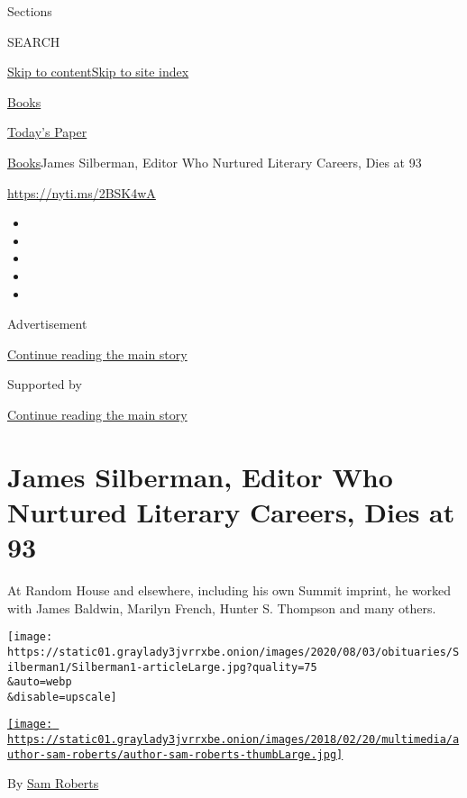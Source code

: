 Sections

SEARCH

\protect\hyperlink{site-content}{Skip to
content}\protect\hyperlink{site-index}{Skip to site index}

\href{https://www.nytimes3xbfgragh.onion/section/books}{Books}

\href{https://myaccount.nytimes3xbfgragh.onion/auth/login?response_type=cookie\&client_id=vi}{}

\href{https://www.nytimes3xbfgragh.onion/section/todayspaper}{Today's
Paper}

\href{/section/books}{Books}\textbar{}James Silberman, Editor Who
Nurtured Literary Careers, Dies at 93

\url{https://nyti.ms/2BSK4wA}

\begin{itemize}
\item
\item
\item
\item
\item
\end{itemize}

Advertisement

\protect\hyperlink{after-top}{Continue reading the main story}

Supported by

\protect\hyperlink{after-sponsor}{Continue reading the main story}

\hypertarget{james-silberman-editor-who-nurtured-literary-careers-dies-at-93}{%
\section{James Silberman, Editor Who Nurtured Literary Careers, Dies at
93}\label{james-silberman-editor-who-nurtured-literary-careers-dies-at-93}}

At Random House and elsewhere, including his own Summit imprint, he
worked with James Baldwin, Marilyn French, Hunter S. Thompson and many
others.

\texttt{[image: https://static01.graylady3jvrrxbe.onion/images/2020/08/03/obituaries/Silberman1/Silberman1-articleLarge.jpg?quality=75\\\&auto=webp\\\&disable=upscale]}

\href{https://www.nytimes3xbfgragh.onion/by/sam-roberts}{\texttt{[image: https://static01.graylady3jvrrxbe.onion/images/2018/02/20/multimedia/author-sam-roberts/author-sam-roberts-thumbLarge.jpg]}}

By \href{https://www.nytimes3xbfgragh.onion/by/sam-roberts}{Sam Roberts}

